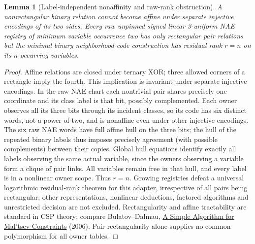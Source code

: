 \documentclass[11pt]{article}
\newtheorem{lemma}[theorem]{Lemma}
\begin{document}
\begin{lemma}[Label-independent nonaffinity and raw-rank obstruction]\label{lem:da19-barrier}
A nonrectangular binary relation cannot become affine under separate injective encodings of its two sides. Every raw unpinned signed linear 3-uniform NAE registry of minimum variable occurrence two has only rectangular pair relations but the minimal binary neighborhood-code construction has residual rank $r=n$ on its $n$ occurring variables.
\end{lemma}
\begin{proof}
Affine relations are closed under ternary XOR; three allowed corners of a rectangle imply the fourth. This implication is invariant under separate injective encodings. In the raw NAE chart each nontrivial pair shares precisely one coordinate and its class label is that bit, possibly complemented. Each owner observes all its three bits through its incident classes, so its code has six distinct words, not a power of two, and is nonaffine even under other injective encodings. The six raw NAE words have full affine hull on the three bits; the hull of the repeated binary labels thus imposes precisely agreement (with possible complements) between their copies. Global hull equations identify exactly all labels observing the same actual variable, since the owners observing a variable form a clique of pair links. All variables remain free in that hull, and every label is in a nonlinear owner scope. Thus $r=n$. Growing registries defeat a universal logarithmic residual-rank theorem for this adapter, irrespective of all pairs being rectangular; other representations, nonlinear deductions, factored algorithms and unrestricted decision are not excluded. Rectangularity and affine tractability are standard in CSP theory; compare Bulatov--Dalmau, \href{https://doi.org/10.1137/050628957}{A Simple Algorithm for Mal'tsev Constraints} (2006). Pair rectangularity alone supplies no common polymorphism for all owner tables.
\end{proof}
\end{document}
